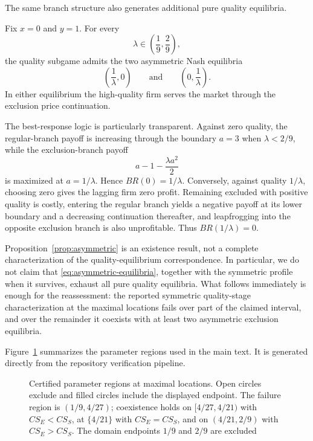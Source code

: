 The same branch structure also generates additional pure quality equilibria.

\begin{proposition}\label{prop:asymmetric}
Fix $x=0$ and $y=1$. For every
\[
 \lambda\in\left(\frac19,\frac29\right),
\]
the quality subgame admits the two asymmetric Nash equilibria
\begin{equation}\label{eq:asymmetric-equilibria}
 \left(\frac1\lambda,0\right)
 \qquad\text{and}\qquad
 \left(0,\frac1\lambda\right).
\end{equation}
In either equilibrium the high-quality firm serves the market through the exclusion price continuation.
\end{proposition}

The best-response logic is particularly transparent. Against zero quality, the regular-branch payoff is increasing through the boundary $a=3$ when $\lambda<2/9$, while the exclusion-branch payoff
\[
 a-1-\frac{\lambda a^2}{2}
\]
is maximized at $a=1/\lambda$. Hence $BR(0)=1/\lambda$. Conversely, against quality $1/\lambda$, choosing zero gives the lagging firm zero profit. Remaining excluded with positive quality is costly, entering the regular branch yields a negative payoff at its lower boundary and a decreasing continuation thereafter, and leapfrogging into the opposite exclusion branch is also unprofitable. Thus $BR(1/\lambda)=0$.

Proposition~\ref{prop:asymmetric} is an existence result, not a complete characterization of the quality-equilibrium correspondence. In particular, we do not claim that \eqref{eq:asymmetric-equilibria}, together with the symmetric profile when it survives, exhaust all pure quality equilibria. What follows immediately is enough for the reassessment: the reported symmetric quality-stage characterization at the maximal locations fails over part of the claimed interval, and over the remainder it coexists with at least two asymmetric exclusion equilibria.

Figure~\ref{fig:regions} summarizes the parameter regions used in the main text. It is generated directly from the repository verification pipeline.

\begin{figure}[t]
\centering

\caption{Certified parameter regions at maximal locations. Open circles exclude and filled circles include the displayed endpoint. The failure region is $(1/9,4/27)$; coexistence holds on $[4/27,4/21)$ with $CS_E<CS_S$, at $\{4/21\}$ with $CS_E=CS_S$, and on $(4/21,2/9)$ with $CS_E>CS_S$. The domain endpoints $1/9$ and $2/9$ are excluded}
\label{fig:regions}
\end{figure}
